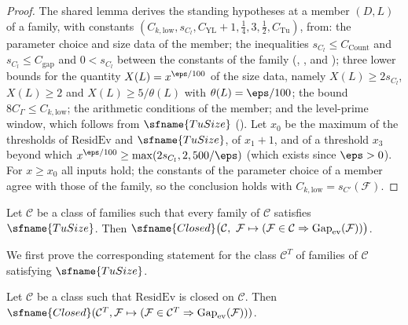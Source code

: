 \begin{proof}
The shared lemma  derives the standing hypotheses at a
member $(D,L)$ of a family, with constants $(C_{k,\mathrm{low}},s_{C_l},C_{\mathrm{YL}}+1,\frac14,3,\frac12,C_{\mathrm{Tu}})$,
from: the parameter choice and size data of the member; the inequalities $s_{C_l}\le C_{\mathrm{Count}}$ and
$s_{C_l}\le C_{\mathrm{gap}}$ and $0<s_{C_l}$ between the constants of the family
(, , and );
three lower bounds for the quantity $X(L)=x^{\eps/100}$ of the size data, namely $X(L)\ge2s_{C_l}$, $X(L)\ge2$ and
$X(L)\ge5/\theta(L)$ with $\theta(L)=\eps/100$; the bound $8C_\Gamma\le C_{k,\mathrm{low}}$; the arithmetic conditions of
the member; and the level-prime window, which follows from $\sfname{TuSize}$ ().
Let $x_0$ be the maximum of the thresholds of $\mathrm{ResidEv}$ and $\sfname{TuSize}$, of $x_1+1$, and of a
threshold $x_3$ beyond which $x^{\eps/100}\ge\max(2s_{C_l},2,500/\eps)$ (which exists since $\eps>0$). For $x\ge x_0$
all inputs hold; the constants of the parameter choice of a member agree with those of the family, so the
conclusion holds with $C_{k,\mathrm{low}}=s_{C'}(\mathcal F)$.
\end{proof}

\begin{proposition}\label{pf:sh-siegel:gapclosed}
Let $\mathcal C$ be a class of families such that every family of $\mathcal C$ satisfies $\sfname{TuSize}$. Then
$\sfname{Closed}\bigl(\mathcal C,\ \mathcal F\mapsto(\mathcal F\in\mathcal C\Rightarrow
\shsiegelGap_{\mathrm{ev}}(\mathcal F))\bigr)$.
\end{proposition}

We first prove the corresponding statement for the class $\mathcal C^T$ of families of $\mathcal C$ satisfying
$\sfname{TuSize}$.

\begin{lemma}\label{pf:sh-siegel:gaprow}
Let $\mathcal C$ be a class such that $\mathrm{ResidEv}$ is closed on $\mathcal C$. Then $\sfname{Closed}(\mathcal
C^T,\mathcal F\mapsto(\mathcal F\in\mathcal C^T\Rightarrow\shsiegelGap_{\mathrm{ev}}(\mathcal F)))$.
\end{lemma}

